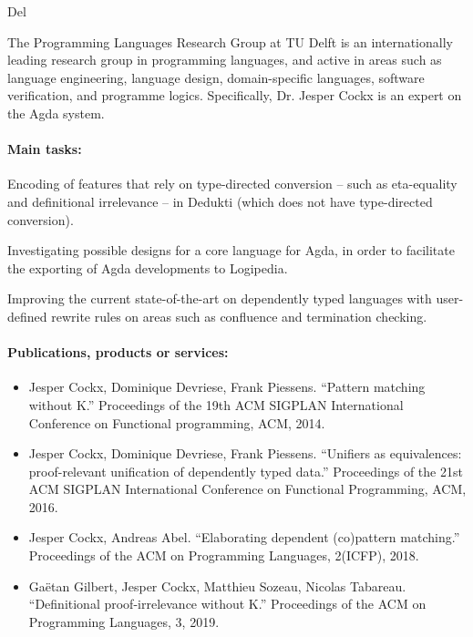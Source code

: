 \begin{sitedescription}{Del}

The Programming Languages Research Group at TU Delft is an
internationally leading research group in programming languages, and
active in areas such as language engineering, language design,
domain-specific languages, software verification, and programme logics.
Specifically, Dr. Jesper Cockx is an expert on the Agda system.

\paragraph{Main tasks:}

\begin{compactitem}
\item Encoding of features that rely on type-directed conversion --
  such as eta-equality and definitional irrelevance -- in Dedukti
  (which does not have type-directed conversion).
\item Investigating possible designs for a core language for Agda, in
  order to facilitate the exporting of Agda developments to Logipedia.
\item Improving the current state-of-the-art on dependently typed
  languages with user-defined rewrite rules on areas such as
  confluence and termination checking.
\end{compactitem}

\paragraph{Publications, products or services:}

\begin{itemize}
  \item Jesper Cockx, Dominique Devriese, Frank Piessens. ``Pattern
  matching without K.'' Proceedings of the 19th ACM SIGPLAN
  International Conference on Functional programming, ACM, 2014.
  \item Jesper Cockx, Dominique Devriese, Frank Piessens. ``Unifiers
  as equivalences: proof-relevant unification of dependently typed
  data.'' Proceedings of the 21st ACM SIGPLAN International Conference
  on Functional Programming, ACM, 2016.
  \item Jesper Cockx, Andreas Abel. ``Elaborating dependent
  (co)pattern matching.'' Proceedings of the ACM on Programming
  Languages, 2(ICFP), 2018.
  \item Gaëtan Gilbert, Jesper Cockx, Matthieu Sozeau, Nicolas
  Tabareau. ``Definitional proof-irrelevance without K.'' Proceedings
  of the ACM on Programming Languages, 3, 2019.
\end{itemize}


\end{sitedescription}
